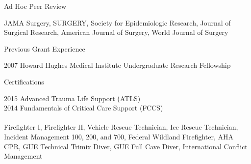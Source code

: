 \documentclass{resume} %
\begin{document}
   
   
   \begin{rSection}{Ad Hoc Peer Review}
 
   JAMA Surgery, SURGERY, Society for Epidemiologic Research, Journal of Surgical Research, American Journal of Surgery, World Journal of Surgery
  
   
   \end{rSection}
   
 
   
   \begin{rSection}{Previous Grant Experience}
  
   2007 \enspace Howard Hughes Medical Institute Undergraduate Research Fellowship 
   
   
   \end{rSection}
   
   
   \begin{rSection}{Certifications}
  
   2015 \enspace Advanced Trauma Life Support (ATLS)\\
   2014 \enspace Fundamentals of Critical Care Support (FCCS) \\
   \\
   Firefighter I, Firefighter II, Vehicle Rescue Technician, Ice Rescue Technician, 
   Incident Management 100, 200, and 700, Federal Wildland Firefighter, AHA CPR,
   GUE Technical Trimix Diver, GUE Full Cave Diver, International Conflict Management
   
   
   \end{rSection}
   
\end{document}
